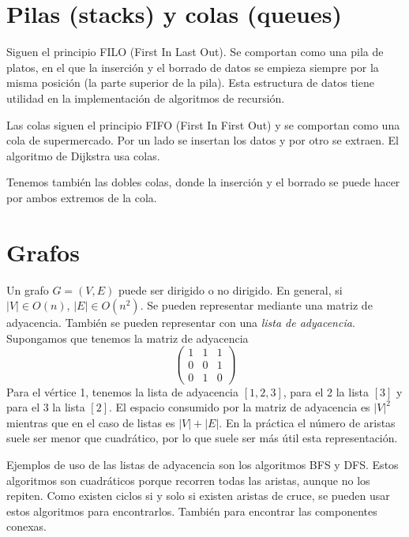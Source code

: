 \documentclass[AL.tex]{subfiles}
\begin{document}
\section{Pilas (stacks) y colas (queues)}
Siguen el principio FILO (First In Last Out). Se comportan como una pila de platos, en el que la inserción y el borrado de datos se empieza siempre por la misma posición (la parte superior de la pila). Esta estructura de datos tiene utilidad en la implementación de algoritmos de recursión.

Las colas siguen el principio FIFO (First In First Out) y se comportan como una cola de supermercado. Por un lado se insertan los datos y por otro se extraen. El algoritmo de Dijkstra usa colas. 

Tenemos también las dobles colas, donde la inserción y el borrado se puede hacer por ambos extremos de la cola. 

\section{Grafos}
Un grafo $G=(V,E)$ puede ser dirigido o no dirigido. En general, si $|V|\in O(n)$, $|E|\in O(n^2)$. Se pueden representar mediante una matriz de adyacencia. También se pueden representar con una \emph{lista de adyacencia}. Supongamos que tenemos la matriz de adyacencia 
$$\begin{pmatrix}
1 & 1 & 1\\
0 & 0 & 1\\
0 & 1 & 0
\end{pmatrix}$$
Para el vértice 1, tenemos la lista de adyacencia $[1,2,3]$, para el 2 la lista $[3]$ y para el 3 la lista $[2]$. El espacio consumido por la matriz de adyacencia es $|V|^2$ mientras que en el caso de listas es $|V|+|E|$. En la práctica el número de aristas suele ser menor que cuadrático, por lo que suele ser más útil esta representación. 

Ejemplos de uso de las listas de adyacencia son los algoritmos BFS y DFS. Estos algoritmos son cuadráticos porque recorren todas las aristas, aunque no los repiten. Como existen ciclos si y solo si existen aristas de cruce, se pueden usar estos algoritmos para encontrarlos. También para encontrar las componentes conexas.
\end{document}
